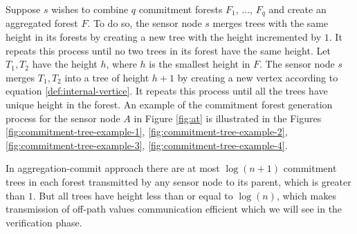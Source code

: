 		Suppose $s$ wishes to combine $q$ commitment forests $F_{1}$, $\dotsc$, $F_{q}$ and create an aggregated forest $F$.
		To do so, the sensor node $s$ merges trees with the same height in its forests by creating a new tree with the height incremented by $1$. 
		It repeats this process until no two trees in its forest have the same height. 
		Let $T_{1}, T_{2}$ have the height $h$, where $h$ is the smallest height in $F$.
		The sensor node $s$ merges $T_{1}, T_{2}$ into a tree of height $h + 1$ by creating a new vertex according to equation \ref{def:internal-vertice}.
		It repeats this process until all the trees have unique height in the forest.
		An example of the commitment forest generation process for the sensor node $A$ in Figure \ref{fig:at} is illustrated in the Figures \ref{fig:commitment-tree-example-1}, \ref{fig:commitment-tree-example-2}, \ref{fig:commitment-tree-example-3}, \ref{fig:commitment-tree-example-4}.

		In aggregation-commit approach there are at most $\log(n+1)$ commitment trees in each forest transmitted by any sensor node to its parent, which is greater than $1$.
		But all trees have height less than or equal to $\log(n)$, which makes transmission of off-path values communication efficient which we will see in the verification phase.

